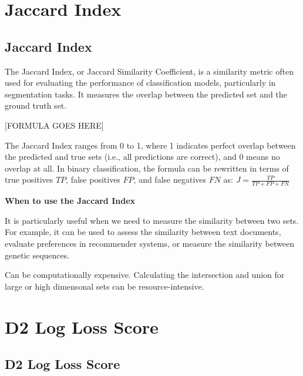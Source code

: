 \clearpage
\thispagestyle{classificationstyle}
\section{Jaccard Index}
\subsection{Jaccard Index}

The Jaccard Index, or Jaccard Similarity Coefficient, is a similarity metric often used for evaluating the performance of classification models,
particularly in segmentation tasks.  It measures the overlap between the predicted set and the ground truth set.

\begin{center}
    [FORMULA GOES HERE]
\end{center}

The Jaccard Index ranges from 0 to 1, where 1 indicates perfect overlap between the predicted and true sets (i.e., all predictions are correct),
and 0 means no overlap at all. In binary classification, the formula can be rewritten in terms of true positives $TP$, false positives $FP$, and false negatives
$FN$ as: $J = \frac{TP}{TP + FP + FN}$

\textbf{When to use the Jaccard Index}

It is particularly useful when we need to measure the similarity between two sets. For example, it can be used to assess the similarity between text documents,
evaluate preferences in recommender systems, or measure the similarity between genetic sequences.

{
    \item Can be computationally expensive. Calculating the intersection and union for large or high dimensonal sets can be resource-intensive.
}


\clearpage
\thispagestyle{classificationstyle}
\section{D2 Log Loss Score}
\subsection{D2 Log Loss Score}

